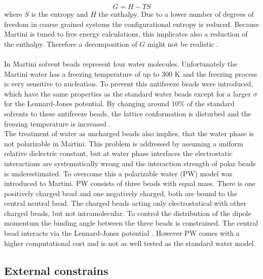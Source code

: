 \begin{equation}
G = H - T S
\end{equation}
where $S$ is the entropy and $H$ the enthalpy. Due to a lower number of degrees of freedom in coarse grained systems the configurational entropy is reduced. Because Martini is tuned to free energy calculations, this implicates also a reduction of the enthalpy. Therefore a decomposition of $G$ might not be realistic \autocite[p. 6811]{martini22_check}.\\
\\
In Martini solvent beads represent four water molecules. Unfortunately the Martini water has a freezing temperature of up to 300 $\si{\kelvin}$ and the freezing process is very sensitive to nucleation. To prevent this antifreeze beads were introduced, which have the same properties as the standard water beads except for a larger $\sigma$ for the Lennard-Jones potential. By changing around 10\% of the standard solvents to these antifreeze beads, the lattice conformation is disturbed and the freezing temperature is increased \autocite[p. 7815]{martini}.\\
The treatment of water as uncharged beads also implies, that the water phase is not polarizable in Martini. This problem is addressed by assuming a uniform relative dielectric constant, but at water phase interfaces the electrostatic interactions are systematically wrong and the interaction strength of polar beads is underestimated. To overcome this a polarizable water (PW) model was introduced to Martini. PW consists of three beads with equal mass. There is one positively charged bead and one negatively charged, both are bound to the central neutral bead. The charged beads acting only electrostatical with other charged beads, but not intramolecular. To control the distribution of the dipole momentum the binding angle between the three beads is constrained. The central bead interacts via the Lennard-Jones potential \autocite{polarizableMartini}. However PW comes with a higher computational cost and is not as well tested as the standard water model.
\subsection{External constrains}
